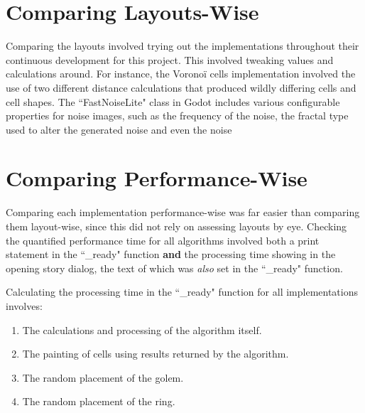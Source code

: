 \section{Comparing Layouts-Wise}

Comparing the layouts involved trying out the implementations throughout their continuous development for this project. This involved tweaking values and calculations around. For instance, the Voronoï cells implementation involved the use of two different distance calculations that produced wildly differing cells and cell shapes. The ``FastNoiseLite" class in Godot includes various configurable properties for noise images, such as the frequency of the noise, the fractal type used to alter the generated noise and even the noise 

\section{Comparing Performance-Wise}

Comparing each implementation performance-wise was far easier than comparing them layout-wise, since this did not rely on assessing layouts by eye. Checking the quantified performance time for all algorithms involved both a print statement in the ``\_ready" function \textbf{and} the processing time showing in the opening story dialog, the text of which was \textit{also} set in the ``\_ready" function.

Calculating the processing time in the ``\_ready" function for all implementations involves:

\begin{enumerate}
    \item The calculations and processing of the algorithm itself.
    \item The painting of cells using results returned by the algorithm.
    \item The random placement of the golem.
    \item The random placement of the ring.
\end{enumerate}

